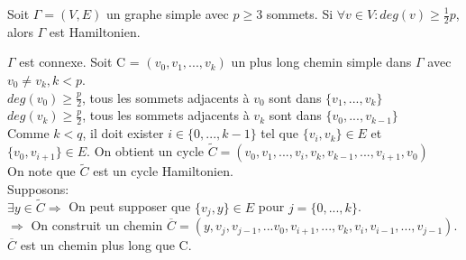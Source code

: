 \begin{exmp}

\end{exmp}




\begin{thrm}[Dirac 1950]
Soit $\Gamma = (V,E)$ un graphe simple avec $p \geq 3$ sommets. Si $\forall v \in V: deg(v) \geq \frac{1}{2}p$, alors $\Gamma$ est Hamiltonien.
\end{thrm}

\begin{demo}
$\Gamma$ est connexe. Soit C = $(v_{0},v_{1},...,v_{k})$ un plus long chemin simple dans $\Gamma$ avec $v_{0} \neq v_{k}, k < p$.\\

$ deg(v_{0}) \geq \frac{p}{2}$, tous les sommets adjacents à $v_{0}$ sont dans $\{v_{1},...,v_{k}\}$\\

$ deg(v_{k}) \geq \frac{p}{2}$, tous les sommets adjacents à $v_{k}$ sont dans $\{v_{0},...,v_{k-1}\}$\\

Comme $k < q$, il doit exister $i \in \{0,...,k-1\}$ tel que $\{v_{i},v_{k}\} \in E$ et $\{v_{0},v_{i+1}\} \in E$. On obtient un cycle $\widetilde{C} = (v_{0},v_{1},...,v_{i},v_{k},v_{k-1},...,v_{i+1},v_{0})$ \\



On note que $\widetilde{C}$ est un cycle Hamiltonien.\\

Supposons:\\

$\exists  y \in \widetilde{C} \Rightarrow$ On peut supposer que $\{ v_{j},y\} \in E$ pour $j=\{0,...,k\}$.\\

$\Rightarrow$ On construit un chemin $\overline{C} = (y, v_{j},v_{j-1},...v_{0},v_{i+1},...,v_{k},v_{i},v_{i-1},...,v_{j-1})$. $\overline{C}$ est un chemin plus long que C. \\

\vspace{-0.8cm}



\end{demo}

